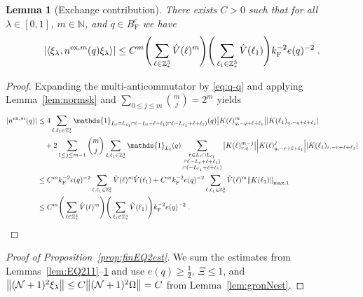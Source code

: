 \documentclass[12pt,a4paper]{article}
\numberwithin{equation}{section}
\newcommand{\NNN}{\mathbb{N}}
\newcommand{\1}{\mathbb{I}}
\newcommand{\ex}{\mathrm{ex}}
\newcommand{\F}{\mathrm{F}}
\newcommand{\Z}{\mathbb{Z}}
\newcommand{\NN}{\mathcal{N}}
\newcommand{\half}{\frac{1}{2}}
\newcommand{\eva}[1]{\left\langle #1 \right\rangle}
\theoremstyle{plain}
\newtheorem{lemma}[theorem]{Lemma}
\theoremstyle{definition}
\theoremstyle{remark}
\theoremstyle{plain}
\theoremstyle{definition}
\theoremstyle{remark}
\begin{document}
\begin{lemma}[Exchange contribution] \label{lem:estnqex}
There exists $ C > 0 $ such that for all $ \lambda \in [0,1] $, $ m \in \NNN $, and $ q \in B_{\F}^c $ we have
\begin{equation}
	\abs{\eva{\xi_\lambda, n^{\ex,m}(q) \xi_\lambda }}
	\leq C^m \Bigg( \sum_{\ell \in \Z^3_*} \hat{V}(\ell)^m \Bigg)
		\Bigg( \sum_{\ell_1 \in \Z^3_*} \hat{V}(\ell_1) \Bigg)
		k_{\F}^{-2} e(q)^{-2} \;. \label{eq:estnqex}
\end{equation}
\end{lemma}

\begin{proof}
Expanding the multi-anticommutator by \eqref{eq:q-q} and applying Lemma~\ref{lem:normsk} and $ \sum_{0 \le j \le m} {{m}\choose j} = 2^m $ yields
\begin{align*}
	|n^{\ex,m}(q)|
	&\leq 4 \sum_{\ell,\ell_1 \in \Z^3_*}
		\mathds{1}_{L_\ell \cap L_{\ell_1} \cap (-L_\ell + \ell + \ell_1) \cap (-L_{\ell_1} + \ell + \ell_1)}(q)
		\abs{K(\ell)^m_{q,-q+\ell+\ell_1}}
		\abs{K(\ell_1)_{q,-q+\ell+\ell_1}} \\
		&\quad + 2 \sum_{1 \le j \le m-1} {{m}\choose j} \sum_{\ell,\ell_1 \in \Z^3_*}
		\mathds{1}_{L_\ell}(q)
		\sum_{\substack{r\in L_{\ell} \cap L_{\ell_1}\\ \cap (-L_{\ell}+\ell+\ell_1) \\ \cap (-L_{\ell_1}+\ell+\ell_1 )}}
		\abs{K(\ell)^{m-j}_{r,q}}
		\abs{K(\ell)^j_{q,-r+\ell+\ell_1}}
		\abs{K(\ell_1)_{r,-r+\ell+\ell_1}} \\
	&\leq C^m k_{\F}^{-2} e(q)^{-2} \sum_{\ell,\ell_1 \in \Z^3_*}
		\hat{V}(\ell)^m
		\hat{V}(\ell_1)
	+ C^m k_{\F}^{-2} e(q)^{-2} \sum_{\ell,\ell_1 \in \Z^3_*}
		\hat{V}(\ell)^m
		\norm{K(\ell_1)}_{\max,1} \\
	&\leq C^m
		\Bigg( \sum_{\ell \in \Z^3_*} \hat{V}(\ell)^m \Bigg)
		\Bigg( \sum_{\ell_1 \in \Z^3_*} \hat{V}(\ell_1) \Bigg)
		k_{\F}^{-2} e(q)^{-2} \;. \qedhere \nonumber
\end{align*}
\end{proof}



\begin{proof}[Proof of Proposition~\ref{prop:finEQ2est}]
We sum the estimates from Lemmas~\ref{lem:EQ211}--\ref{lem:estnqex} and use $ e(q) \ge \half $, $ \Xi \le 1 $, and $ \norm{(\NN+1)^2 \xi_\lambda} \le C \norm{(\NN+1)^2 \Omega} = C $ from Lemma~\ref{lem:gronNest}.
\end{proof}
\end{document}
